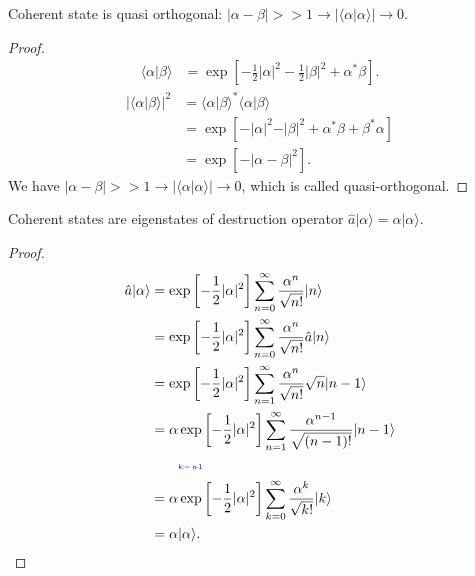 \documentclass[../../note.tex]{subfiles}
\begin{document}
\begin{lemma}
    Coherent state is quasi orthogonal: $\vert \alpha - \beta \vert >> 1 \longrightarrow \vert \langle \alpha \vert \alpha \rangle \vert \rightarrow 0$.
\end{lemma}
\begin{proof}
    \begin{align}
        \langle \alpha \vert \beta \rangle
        &= \exp\left[-\frac{1}{2} \vert \alpha \vert^2 - \frac{1}{2} \vert \beta \vert^2 + \alpha^\ast \beta \right].
    \end{align}
    \begin{align}
        \vert \langle \alpha \vert \beta \rangle \vert^2
        &= \langle \alpha \vert \beta \rangle^\ast \langle \alpha \vert \beta \rangle \\
        &= \exp\left[- \vert \alpha \vert^2 - \vert \beta \vert^2 + \alpha^\ast \beta + \beta^\ast \alpha   \right] \\
        &= \exp\left[- \vert \alpha -\beta \vert^2 \right].
    \end{align}
    We have $\vert \alpha - \beta \vert >> 1 \longrightarrow \vert \langle \alpha \vert \alpha \rangle \vert \rightarrow 0$, which is called quasi-orthogonal.
\end{proof}

\begin{lemma}
    \label{lemma: coherent state robust}
    Coherent states are eigenstates of destruction operator $\hat{a} \vert \alpha \rangle = \alpha \vert \alpha \rangle$.
\end{lemma}
\begin{proof}
    \begin{align}
        \hat{a} \vert \alpha \rangle
        &= \exp\left[-\frac{1}{2} \vert \alpha \vert^2 \right] \sum_{n=0}^{\infty} \frac{\alpha^n}{\sqrt{n !}} \vert n \rangle \\
        &= \exp\left[-\frac{1}{2} \vert \alpha \vert^2 \right] \sum_{n=0}^{\infty} \frac{\alpha^n}{\sqrt{n !}} \hat{a} \vert n \rangle \\
        &= \exp\left[-\frac{1}{2} \vert \alpha \vert^2 \right] \sum_{n=1}^{\infty} \frac{\alpha^n}{\sqrt{n !}} \sqrt{n}\vert n-1 \rangle \\
        &= \alpha \exp\left[-\frac{1}{2} \vert \alpha \vert^2 \right] \sum_{n=1}^{\infty} \frac{\alpha^{n-1}}{\sqrt{(n-1) !}} \vert n-1 \rangle \\
        &\qquad\text{\color{blue}{\tiny\sffamily k:= n-1}} \nonumber \\
        &= \alpha \exp\left[-\frac{1}{2} \vert \alpha \vert^2 \right] \sum_{k=0}^{\infty} \frac{\alpha^{k}}{\sqrt{k !}} \vert k \rangle \\
        &= \alpha \vert \alpha \rangle.
    \end{align}    
\end{proof}
\end{document}
